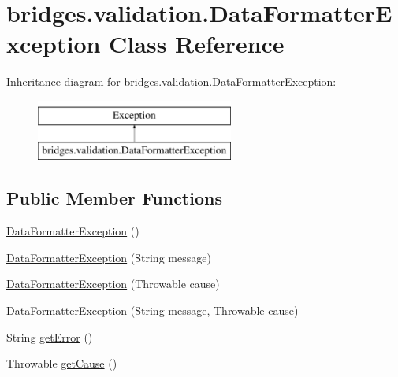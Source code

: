 \hypertarget{classbridges_1_1validation_1_1_data_formatter_exception}{}\section{bridges.\+validation.\+Data\+Formatter\+Exception Class Reference}
\label{classbridges_1_1validation_1_1_data_formatter_exception}
Inheritance diagram for bridges.\+validation.\+Data\+Formatter\+Exception\+:\begin{figure}[H]
\begin{center}
\leavevmode
\includegraphics[height=2.000000cm]{classbridges_1_1validation_1_1_data_formatter_exception}
\end{center}
\end{figure}
\subsection*{Public Member Functions}
\begin{DoxyCompactItemize}
\item 
\mbox{\hyperlink{classbridges_1_1validation_1_1_data_formatter_exception_aa922b9fa359b89c0b25eaa1efd0cfd07}{Data\+Formatter\+Exception}} ()
\item 
\mbox{\hyperlink{classbridges_1_1validation_1_1_data_formatter_exception_abadd66eb3ea98c1af1ff397912ed73bf}{Data\+Formatter\+Exception}} (String message)
\item 
\mbox{\hyperlink{classbridges_1_1validation_1_1_data_formatter_exception_ae7ce6479c3caf8077d5e34b79fe980dd}{Data\+Formatter\+Exception}} (Throwable cause)
\item 
\mbox{\hyperlink{classbridges_1_1validation_1_1_data_formatter_exception_acaec0fe0a826d08481207a3bac21c913}{Data\+Formatter\+Exception}} (String message, Throwable cause)
\item 
String \mbox{\hyperlink{classbridges_1_1validation_1_1_data_formatter_exception_ad60457ab04769d2c80e6ba77a6307ce1}{get\+Error}} ()
\item 
Throwable \mbox{\hyperlink{classbridges_1_1validation_1_1_data_formatter_exception_a6223e92ea95f3050d532997cb115cf2a}{get\+Cause}} ()
\end{DoxyCompactItemize}
